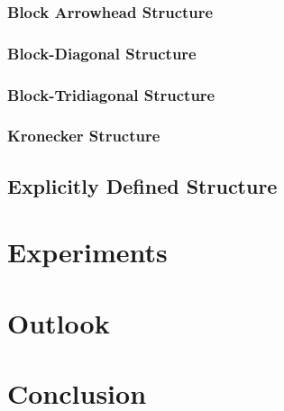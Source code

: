 \documentclass[a4paper, 11pt, oneside]{scrartcl}
\theoremstyle{break}
\numberwithin{equation}{section}
\begin{document}
			\subsubsection{Block Arrowhead Structure}
			\subsubsection{Block-Diagonal Structure}
			\subsubsection{Block-Tridiagonal Structure}
			\subsubsection{Kronecker Structure}
		\subsection{Explicitly Defined Structure}

	\section{Experiments}

	\section{Outlook}

	\section{Conclusion}

	\newpage
	\printbibliography
\end{document}
